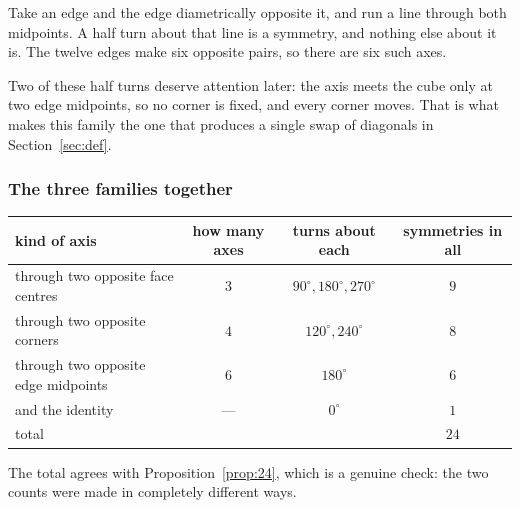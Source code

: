Take an edge and the edge diametrically opposite it, and run a line through both midpoints.
A half turn about that line is a symmetry, and nothing else about it is. The twelve edges make six
opposite pairs, so there are six such axes.



Two of these half turns deserve attention later: the axis meets the cube only at two edge
midpoints, so no corner is fixed, and every corner moves. That is what makes this family the one
that produces a single swap of diagonals in Section~\ref{sec:def}.

\subsubsection{The three families together}

\begin{center}
\small
\begin{tabular}{@{}lccc@{}}
\toprule
kind of axis & how many axes & turns about each & symmetries in all\\
\midrule
through two opposite face centres & $3$ & $90^\circ,180^\circ,270^\circ$ & $9$\\
through two opposite corners & $4$ & $120^\circ,240^\circ$ & $8$\\
through two opposite edge midpoints & $6$ & $180^\circ$ & $6$\\
\midrule
and the identity & --- & $0^\circ$ & $1$\\
\midrule
total & & & $24$\\
\bottomrule
\end{tabular}
\end{center}

\noindent The total agrees with Proposition~\ref{prop:24}, which is a genuine check: the two counts
were made in completely different ways.


